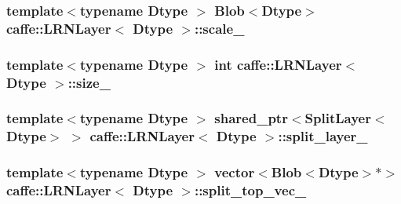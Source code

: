 \hypertarget{classcaffe_1_1_l_r_n_layer_a61a44943c15c502c557df755d8ef4c6c}{
\subsubsection[{scale\+\_\+}]{\setlength{\rightskip}{0pt plus 5cm}template$<$typename Dtype $>$ {\bf Blob}$<$Dtype$>$ {\bf caffe\+::\+L\+R\+N\+Layer}$<$ Dtype $>$\+::scale\+\_\+\hspace{0.3cm}{\ttfamily [protected]}}}\label{classcaffe_1_1_l_r_n_layer_a61a44943c15c502c557df755d8ef4c6c}
\hypertarget{classcaffe_1_1_l_r_n_layer_a4d74c3370e28abe013bf0fcc815fcc17}{
\subsubsection[{size\+\_\+}]{\setlength{\rightskip}{0pt plus 5cm}template$<$typename Dtype $>$ int {\bf caffe\+::\+L\+R\+N\+Layer}$<$ Dtype $>$\+::size\+\_\+\hspace{0.3cm}{\ttfamily [protected]}}}\label{classcaffe_1_1_l_r_n_layer_a4d74c3370e28abe013bf0fcc815fcc17}
\hypertarget{classcaffe_1_1_l_r_n_layer_a7126b6cbb83ddafb80c9d9dc6d44f88f}{
\subsubsection[{split\+\_\+layer\+\_\+}]{\setlength{\rightskip}{0pt plus 5cm}template$<$typename Dtype $>$ shared\+\_\+ptr$<${\bf Split\+Layer}$<$Dtype$>$ $>$ {\bf caffe\+::\+L\+R\+N\+Layer}$<$ Dtype $>$\+::split\+\_\+layer\+\_\+\hspace{0.3cm}{\ttfamily [protected]}}}\label{classcaffe_1_1_l_r_n_layer_a7126b6cbb83ddafb80c9d9dc6d44f88f}
\hypertarget{classcaffe_1_1_l_r_n_layer_a9b199156b8113800365c64c22e0e177a}{
\subsubsection[{split\+\_\+top\+\_\+vec\+\_\+}]{\setlength{\rightskip}{0pt plus 5cm}template$<$typename Dtype $>$ vector$<${\bf Blob}$<$Dtype$>$$\ast$$>$ {\bf caffe\+::\+L\+R\+N\+Layer}$<$ Dtype $>$\+::split\+\_\+top\+\_\+vec\+\_\+\hspace{0.3cm}{\ttfamily [protected]}}}\label{classcaffe_1_1_l_r_n_layer_a9b199156b8113800365c64c22e0e177a}
